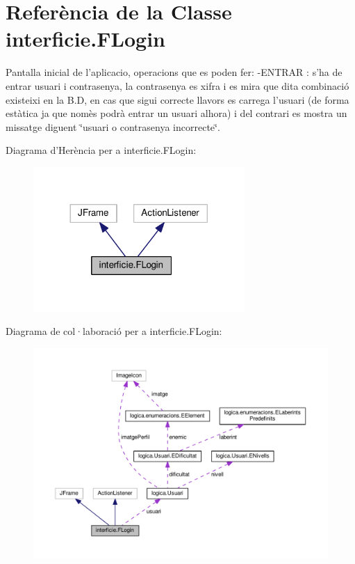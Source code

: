 \hypertarget{classinterficie_1_1_f_login}{\section{Referència de la Classe interficie.\+F\+Login}
\label{classinterficie_1_1_f_login}
}


Pantalla inicial de l'aplicacio, operacions que es poden fer\+: -\/\+E\+N\+T\+R\+A\+R \+: s'ha de entrar usuari i contrasenya, la contrasenya es xifra i es mira que dita combinació existeixi en la B.\+D, en cas que sigui correcte llavors es carrega l'usuari (de forma estàtica ja que nomès podrà entrar un usuari alhora) i del contrari es mostra un missatge diguent \char`\"{}usuari o contrasenya incorrecte\char`\"{}.  




Diagrama d'Herència per a interficie.\+F\+Login\+:
\nopagebreak
\begin{figure}[H]
\begin{center}
\leavevmode
\includegraphics[width=228pt]{classinterficie_1_1_f_login__inherit__graph}
\end{center}
\end{figure}


Diagrama de col·laboració per a interficie.\+F\+Login\+:
\nopagebreak
\begin{figure}[H]
\begin{center}
\leavevmode
\includegraphics[width=350pt]{classinterficie_1_1_f_login__coll__graph}
\end{center}
\end{figure}
